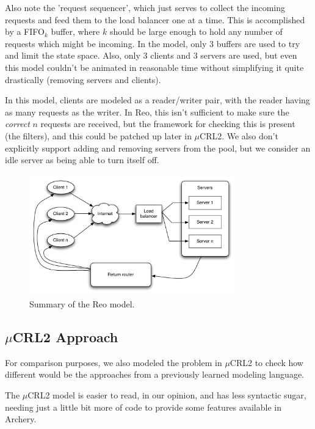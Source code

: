 \documentclass[a4paper]{article}
\newcommand{\ar}{Archery\xspace}
\newcommand{\re}{Reo\xspace}
\newcommand{\mcrl}{$\mu$CRL2\xspace}
\begin{document}
Also note the 'request sequencer', which just serves to collect the incoming
requests and feed them to the load balancer one at a time. This is accomplished
by a FIFO$_k$ buffer, where $k$ should be large enough to hold any number of
requests which might be incoming. In the model, only 3 buffers are used to try
and limit the state space. Also, only 3 clients and 3 servers are used, but even
this model couldn't be animated in reasonable time without simplifying it quite
drastically (removing servers and clients).

In this model, clients are modeled as a reader/writer pair, with the reader
having as many requests as the writer. In \re, this isn't sufficient to make
sure the \emph{correct} $n$ requests are received, but the framework for
checking this is present (the filters), and this could be patched up later in
\mcrl. We also don't explicitly support adding and removing servers from the
pool, but we consider an idle server as being able to turn itself off.

\begin{figure}[h]
    \begin{center}
        \includegraphics[width=0.8\textwidth]{images/reo-model.pdf}
    \end{center}
    \caption{Summary of the \re model.}
    \label{fig:reo}
\end{figure}

\subsection{\mcrl Approach}
For comparison purposes, we also modeled the problem in \mcrl to check how
different would be the approaches from a previously learned modeling language.

The \mcrl model is easier to read, in our opinion, and has less syntactic
sugar, needing just a little bit more of code to provide some features
available in \ar.
\end{document}
